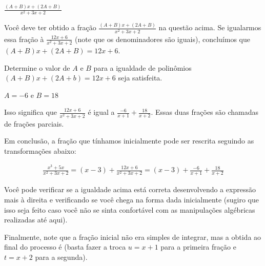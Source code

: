 \documentclass[main_estudante.tex]{subfiles}
\begin{document}
\begin{gabarito}
	\begin{gabaritoQuestao}
		$\frac{(A+B)x+(2A+B)}{x^2+3x+2}$
	\end{gabaritoQuestao}
\end{gabarito}

Você deve ter obtido a fração $\frac{(A+B)x+(2A+B)}{x^2+3x+2}$ na questão acima. Se igualarmos essa fração à $\frac{12x+6}{x^2+3x+2}$ (note que os denominadores são iguais), concluímos que $(A+B)x+(2A+B)=12x+6$.

\begin{questao}
Determine o valor de $A$ e $B$ para a igualdade de polinômios $(A+B)x+(2A+b)=12x+6$ seja satisfeita.
\end{questao}


\begin{gabarito}
	\begin{gabaritoQuestao}
		$A=-6$ e $B=18$
	\end{gabaritoQuestao}
\end{gabarito}

Isso significa que $\frac{12x+6}{x^2+3x+2}$ é igual a $\frac{-6}{x+1}+\frac{18}{x+2}$. Essas duas frações são chamadas de frações parciais.

Em conclusão, a fração que tínhamos inicialmente pode ser rescrita seguindo as transformações abaixo:

\begin{align*}
\frac{x^3+5x}{x^2+3x+2} = (x-3)+\frac{12x+6}{x^2+3x+2} = (x-3)+\frac{-6}{x+1}+\frac{18}{x+2}
\end{align*}

Você pode verificar se a igualdade acima está correta desenvolvendo a expressão mais à direita e verificando se você chega na forma dada inicialmente (sugiro que isso seja feito caso você não se sinta confortável com as manipulações algébricas realizadas até aqui).

Finalmente, note que a fração inicial não era simples de integrar, mas a obtida ao final do processo é (basta fazer a troca $u=x+1$ para a primeira fração e $t=x+2$ para a segunda).
\end{document}
